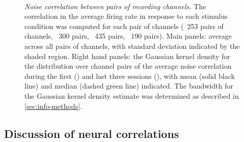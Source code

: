 \begin{figure}[htbp]%
    \centering
    \hspace*{\fill}
    \hspace*{\fill}\hspace{.2cm}\hspace*{\fill}
    \hspace*{\fill}
    \\
    \hspace*{\fill}
    \hspace*{\fill}\hspace{.2cm}\hspace*{\fill}
    \hspace*{\fill}
    \caption{\textit{Noise correlation between pairs of recording channels.}
The correlation in the average firing rate in response to each stimulus condition was computed for each pair of channels (\protect{}~\num{253} pairs of channels, \protect{}~\num{300} pairs, \protect{}~\num{435} pairs, \protect{}~\num{190} pairs).
Main panels: average across all pairs of channels, with standard deviation indicated by the shaded region.
Right hand panels: the Gaussian kernel density for the distribution over channel pairs of the average noise correlation during the first () and last three sessions (), with mean (solid black line) and median (dashed green line) indicated.
The bandwidth for the Gaussian kernel density estimate was determined as described in \autoref{sec:info-methods}.
}
    \label{fig:pl_noisecor}
\end{figure}


\subsection{Discussion of neural correlations}

